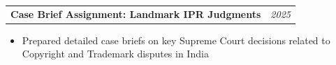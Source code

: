 \documentclass[10pt, a4paper]{article}
\makeatletter
\newcommand{\cventry}[2]{%
  \noindent
  \begin{tabularx}{\linewidth}{@{}X r@{}}
    \textbf{\small\color{darktext}#1} &
    \textit{\footnotesize\color{graytext}#2}
  \end{tabularx}\vspace{1pt}%
}
\makeatother
\begin{document}
\vspace{4pt}
\cventry{Case Brief Assignment: Landmark IPR Judgments}{2025}
\begin{itemize}
  \item Prepared detailed case briefs on key Supreme Court decisions related to Copyright and
        Trademark disputes in India
\end{itemize}


\end{document}
